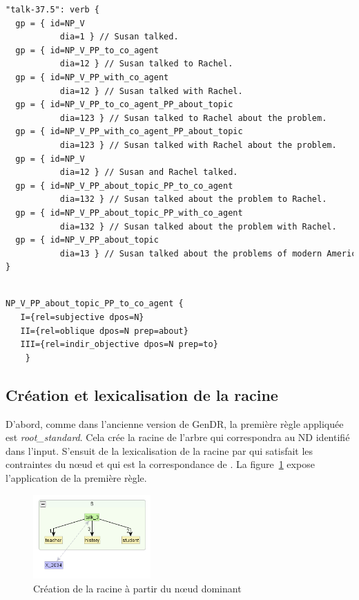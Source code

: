 \begin{minipage}{\linewidth}
\begin{lstlisting}[language=XML, caption=Classe \texttt{talk-37.5}]
"talk-37.5": verb {
  gp = { id=NP_V
	       dia=1 } // Susan talked.
  gp = { id=NP_V_PP_to_co_agent
	       dia=12 } // Susan talked to Rachel.
  gp = { id=NP_V_PP_with_co_agent
	       dia=12 } // Susan talked with Rachel.
  gp = { id=NP_V_PP_to_co_agent_PP_about_topic
	       dia=123 } // Susan talked to Rachel about the problem.
  gp = { id=NP_V_PP_with_co_agent_PP_about_topic
	       dia=123 } // Susan talked with Rachel about the problem.
  gp = { id=NP_V
	       dia=12 } // Susan and Rachel talked.
  gp = { id=NP_V_PP_about_topic_PP_to_co_agent
	       dia=132 } // Susan talked about the problem to Rachel.
  gp = { id=NP_V_PP_about_topic_PP_with_co_agent
	       dia=132 } // Susan talked about the problem with Rachel.
  gp = { id=NP_V_PP_about_topic
	       dia=13 } // Susan talked about the problems of modern America.
}
\end{lstlisting}
\end{minipage}

\begin{minipage}{\linewidth}
\begin{lstlisting}[language=XML, caption=Propriétés syntaxiques de \texttt{NP\_V\_PP\_about\_topic\_PP\_to\_co\_agent} , label=gpexemple]

NP_V_PP_about_topic_PP_to_co_agent {
   I={rel=subjective dpos=N}
   II={rel=oblique dpos=N prep=about}
   III={rel=indir_objective dpos=N prep=to}
	}
\end{lstlisting}
\end{minipage}

\subsection{Création et lexicalisation de la racine}
D'abord, comme dans l'ancienne version de GenDR, la première règle appliquée est \emph{root\_standard}. Cela crée la racine de l'arbre qui correspondra au \ac{ND} identifié dans l'input. S'ensuit de la lexicalisation de la racine par  qui satisfait les contraintes du n\oe{}ud et qui est la correspondance de . La figure~\ref{deroulement0} expose l'application de la première règle.
\begin{figure}[htb]
	\centering
	\includegraphics[width=0.4\textwidth, trim = {0cm 0cm 0cm 0cm},clip]{ch6/figs/root.png}
	\caption{Création de la racine à partir du n\oe{}ud dominant}
	\label{deroulement0}
\end{figure}


